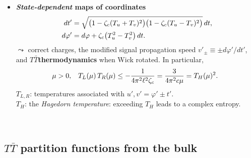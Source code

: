 \documentclass[10pt]{article}
\newcommand{\citations}[1]{{\footnotesize#1\par}}
\newcommand{\TTbar}{\texorpdfstring{\ensuremath{T\bar{T}}}{TTbar}\xspace}
\begin{document}
\begin{multicols}{3}
\begin{itemize}
\columnbreak

\vspace*{-8\baselineskip}

	\item \textbf{\textit{State-dependent} maps of \mbox{coordinates}}
	\begin{align}
		dt' &= \sqrt{ \big(1 - \zeta_c (T_u+T_v)^2 \big) \big(1 - \zeta_c (T_u-T_v)^2 \big) } \, dt, \notag \\
		 d\varphi' &= d\varphi + \zeta_c \big( T_u^2 - T_v^2 \big)\,dt.
	\label{eq:state_dependent_map}
	\end{align}
	$\leadsto$ correct charges, the modified signal propagation speed $v'_{\pm} \equiv \pm {d\varphi'}/{dt'}$, and \TTbar \textbf{thermodynamics} when Wick rotated. In particular,
	\begin{equation*}
	\hspace{-.5em} \mu > 0,\ \ \,
		T_L(\mu)\,T_R(\mu) \le - \frac{1}{4\pi^2 \ell^2 \zeta_c} = \frac{3}{4\pi^2c\mu} = T_H(\mu)^2.
	\end{equation*}
	$T_{L,R}$: temperatures associated with $u',v' = \varphi' \pm t'$.\\
	$T_H$: the \textit{Hagedorn temperature}: exceeding $T_H$ leads to a complex entropy.

\begin{flushright}
\vspace{-.5\baselineskip}
\citations{
\textcite{Giveon:2017nie}\\
\textcite{Apolo:2019zai}
}
\vspace{-.8\baselineskip}
\end{flushright}

\end{itemize}

\subsection*{\TTbar partition functions from the bulk} \label{se:partitionfunction}


\end{multicols}
\end{document}
